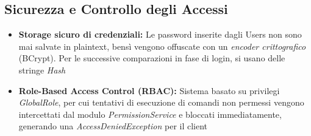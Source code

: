 \subsection{Sicurezza e Controllo degli Accessi}
\begin{itemize}[itemsep=2pt]
    \item \textbf{Storage sicuro di credenziali:} Le password inserite dagli Users non sono mai salvate in plaintext, bensì vengono offuscate con un \textit{encoder crittografico} (BCrypt). Per le successive comparazioni in fase di login, si usano delle stringe \textit{Hash}
    \item \textbf{Role-Based Access Control (RBAC):} Sistema basato su privilegi \textit{GlobalRole}, per cui tentativi di esecuzione di comandi non permessi vengono intercettati dal modulo \textit{PermissionService} e bloccati immediatamente, generando una \textit{AccessDeniedException} per il client
\end{itemize}